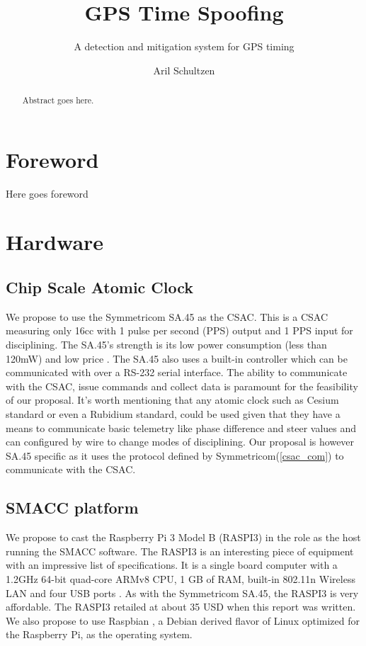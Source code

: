 \documentclass[12pt,english,a4paper]{report}
\title{GPS Time Spoofing}
\subtitle{A detection and mitigation system for GPS timing}
\author{Aril Schultzen}
\begin{document}
\duoforside[dept={Institutt for informatikk},
program={Informatikk: programmering og nettverk},
long]

\begin{abstract}
Abstract goes here.
\end{abstract}

\chapter*{Foreword}
Here goes foreword

\thispagestyle{empty}
\setcounter{page}{0}
\tableofcontents
\thispagestyle{empty}
\setcounter{page}{0}
\thispagestyle{empty}
\setcounter{page}{0}
\clearpage
\setcounter{page}{1}





\chapter{Hardware}

\section{Chip Scale Atomic Clock}
We propose to use the Symmetricom SA.45 as the CSAC. This is a CSAC measuring only 16cc with 1 pulse per second (PPS) output and 1 PPS input for disciplining. The SA.45's strength is its low power consumption (less than 120mW) and low price \cite{SADS}. The SA.45 also uses a built-in controller which can be communicated with over a RS-232 serial interface. The ability to communicate with the CSAC, issue commands and collect data is paramount for the feasibility of our proposal. It's worth mentioning that any atomic clock such as Cesium standard or even a Rubidium standard, could be used given that they have a means to communicate basic telemetry like phase difference and steer values and can configured by wire to change modes of disciplining. Our proposal is however SA.45 specific as it uses the protocol defined by Symmetricom(\ref{csac_com}) to communicate with the CSAC. 

\section{SMACC platform}
We propose to cast the Raspberry Pi 3 Model B (RASPI3) in the role as the host running the SMACC software. The RASPI3 is an interesting piece of equipment with an impressive list of specifications. It is a single board computer with a 1.2GHz 64-bit quad-core ARMv8 CPU, 1 GB of RAM, built-in 802.11n Wireless LAN and four USB ports \cite{RASPI}. As with the Symmetricom SA.45, the RASPI3 is very affordable. The RASPI3 retailed at about 35 USD when this report was written. We also propose to use Raspbian \cite{RASPBIAN}, a Debian derived flavor of Linux optimized for the Raspberry Pi, as the operating system. 
\end{document}
